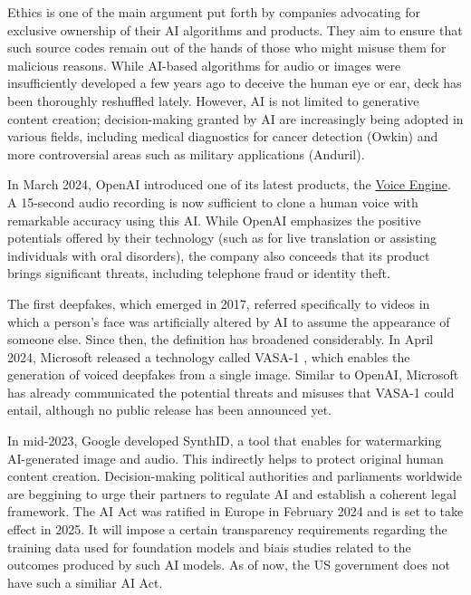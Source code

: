 Ethics is one of the main argument put forth by companies advocating for exclusive ownership of their \ac{AI} algorithms and products. They aim to ensure that such source codes remain out of the hands of those who might misuse them for malicious reasons. While \ac{AI}-based algorithms for audio or images were insufficiently developed a few years ago to deceive the human eye or ear, deck has been thoroughly reshuffled lately. However, \ac{AI} is not limited to generative content creation; decision-making granted by \ac{AI} are increasingly being adopted in various fields, including medical diagnostics for cancer detection (\eg Owkin) and  more controversial areas such as military applications (\eg Anduril).

In March 2024, OpenAI introduced one of its latest products, the \href{https://openai.com/blog/navigating-the-challenges-and-opportunities-of-synthetic-voices}{Voice Engine}. A 15-second audio recording is now sufficient to clone a human voice with remarkable accuracy using this \ac{AI}. While OpenAI emphasizes the positive potentials offered by their technology (such as for live translation or assisting individuals with oral disorders), the company also conceeds that its product brings significant threats, including telephone fraud or identity theft. 

The first deepfakes, which emerged in 2017, referred specifically to videos in which a person's face was artificially altered by \ac{AI} to assume the appearance of someone else. Since then, the definition has broadened considerably. In April 2024, Microsoft released a technology called VASA-1 \citep{xu2024vasa1}, which enables the generation of voiced deepfakes from a single image. Similar to OpenAI, Microsoft has already communicated the potential threats and misuses that VASA-1 could entail, although no public release has been announced yet.

In mid-2023, Google developed SynthID, a tool that enables for watermarking \ac{AI}-generated image and audio. This indirectly helps to protect original human content creation. Decision-making political authorities and parliaments worldwide are beggining to urge their partners to regulate \ac{AI} and establish a coherent legal framework. The AI Act was ratified in Europe in February 2024 and is set to take effect in 2025. It will impose a certain transparency requirements regarding the training data used for foundation models and biais studies related to the outcomes produced by such \ac{AI} models. As of now, the US government does not have such a similiar AI Act. 


